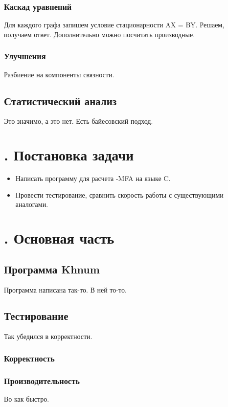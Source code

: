 \documentclass[14pt, a4paper]{extreport}
\newcommand{\CC}{C\nolinebreak\hspace{-.05em}\raisebox{.4ex}{\tiny\bf +}\nolinebreak\hspace{-.10em}\raisebox{.4ex}{\tiny\bf +}}
\def\CC{{C\nolinebreak[4]\hspace{-.05em}\raisebox{.4ex}{\tiny\bf ++}}} %
\begin{document}
\clearpage

\subsection{Каскад уравнений}
Для каждого графа запишем условие стационарности AX = BY. Решаем, получаем ответ. Дополнительно можно посчитать производные.

\subsection{Улучшения}
Разбиение на компоненты связности.




\clearpage
\section{Статистический анализ}
Это значимо, а это нет. Есть байесовский подход.

\chapter[Постановка задачи]{\thechapter{}. Постановка задачи}
\begin{itemize}
	\item Написать программу для расчета -MFA на языке \CC.
	\item Провести тестирование, сравнить скорость работы с существующими аналогами.
\end{itemize}

\chapter[Основная часть]{\thechapter{}. Основная часть}
\section{Программа Khnum}
Программа написана так-то. В ней то-то. 

\section{Тестирование}
Так убедился в корректности.

\subsection{Корректность}

\subsection{Производительность}
Во как быстро.
\end{document}
